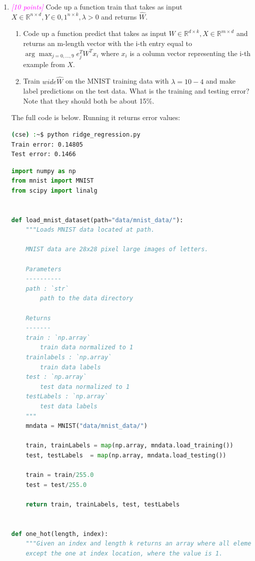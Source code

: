 \documentclass{article}
\newcommand{\argmax}{\arg\!\max}
\newcommand{\field}[1]{\mathbb{#1}}
\newcommand{\1}{\mathbf{1}}
\newcommand{\R}{\field{R}} %
\newcommand{\points}[1]{\small\textcolor{magenta}{\emph{[#1 points]}} \normalsize}
\begin{document}
\begin{enumerate}
    
    \item \points{10} Code up a function train that takes as input $X\in\R^{n\times d},Y\in {0,1}^{n\times k},\lambda>0$ and returns $\hat W$.
    \begin{enumerate}
        \item Code up a function predict that takes as input $W\in\R^{d\times k},X\in\R^{m\times d}$ and returns an m-length vector with the i-th entry equal to $\argmax_{j=0,...,9}e^T_jW^Tx_i$ where $x_i$ is a column vector representing the i-th example from $X$.
        \item Train $wide\hat W$ on the MNIST training data with $\lambda = 10−4$ and make label predictions on the test data. What is the training and testing error? Note that they should both be about 15\%.
    \end{enumerate}
    The full code is below. Running it returns error values:
    
\begin{lstlisting}[language=Bash]
(cse) :~$ python ridge_regression.py 
Train error: 0.14805
Test error: 0.1466
\end{lstlisting}

\begin{lstlisting}[language=Python]
import numpy as np
from mnist import MNIST
from scipy import linalg


def load_mnist_dataset(path="data/mnist_data/"):
    """Loads MNIST data located at path.

    MNIST data are 28x28 pixel large images of letters.

    Parameters
    ----------
    path : `str`
        path to the data directory

    Returns
    -------
    train : `np.array`
        train data normalized to 1
    trainlabels : `np.array`
        train data labels
    test : `np.array`
        test data normalized to 1
    testLabels : `np.array`
        test data labels    
    """
    mndata = MNIST("data/mnist_data/")

    train, trainLabels = map(np.array, mndata.load_training())
    test, testLabels  = map(np.array, mndata.load_testing())

    train = train/255.0
    test = test/255.0

    return train, trainLabels, test, testLabels


def one_hot(length, index):
    """Given an index and length k returns an array where all elements are zero
    except the one at index location, where the value is 1.


\end{lstlisting}
\end{enumerate}
\end{document}
